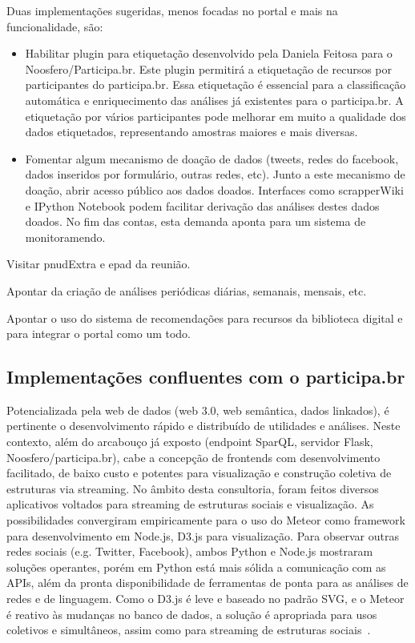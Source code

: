 \documentclass[12pt]{article}
\begin{document}
Duas implementações sugeridas, menos focadas no portal e mais na funcionalidade, são:
\begin{itemize}
    \item Habilitar plugin para etiquetação desenvolvido pela Daniela Feitosa para o Noosfero/Participa.br. Este plugin permitirá a etiquetação de recursos por participantes do participa.br. Essa etiquetação é essencial para a classificação automática e enriquecimento das análises já existentes para o participa.br. A etiquetação por vários participantes pode melhorar em muito a qualidade dos dados etiquetados, representando amostras maiores e mais diversas.
    \item Fomentar algum mecanismo de doação de dados (tweets, redes do facebook, dados inseridos por formulário, outras redes, etc). Junto a este mecanismo de doação, abrir acesso público aos dados doados. Interfaces como scrapperWiki e IPython Notebook podem facilitar derivação das análises destes dados doados. No fim das contas, esta demanda aponta para um sistema de monitoramendo.
\end{itemize}


Visitar pnudExtra e epad da reunião.

Apontar da criação de análises periódicas diárias, semanais, mensais, etc.

Apontar o uso do sistema de recomendações para recursos da biblioteca digital e para integrar o portal como um todo.

\subsection{Implementações confluentes com o participa.br}
Potencializada pela web de dados (web 3.0, web semântica, dados linkados),
é pertinente o desenvolvimento rápido e distribuído de utilidades e análises. Neste contexto, além do arcabouço já exposto (endpoint SparQL, servidor Flask, Noosfero/participa.br), cabe a concepção de frontends com desenvolvimento facilitado, de baixo custo e potentes para visualização e construção coletiva de estruturas via streaming. No âmbito desta consultoria, foram feitos diversos aplicativos voltados para streaming de estruturas sociais e visualização. As possibilidades convergiram empiricamente para o uso do Meteor como framework para desenvolvimento em Node.js, D3.js para visualização. Para observar outras redes sociais (e.g. Twitter, Facebook), ambos Python e Node.js mostraram soluções operantes, porém em Python está mais sólida a comunicação com as APIs, além da pronta disponibilidade de ferramentas de ponta para as análises de redes e de linguagem. Como o D3.js é leve e baseado no padrão SVG, e o Meteor é reativo às mudanças no banco de dados, a solução é apropriada para usos coletivos e simultâneos, assim como para streaming de estruturas sociais~\cite{teloes,oscs,mm,mmissa}.
\end{document}
